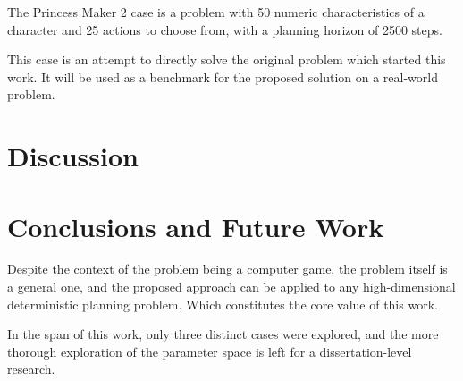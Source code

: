\documentclass[11pt, a4paper]{article}
\begin{document}
	The Princess Maker 2 case is a problem with 50 numeric characteristics of a character and 25 actions to choose from, with a planning horizon of 2500 steps.

	This case is an attempt to directly solve the original problem which started this work.
	It will be used as a benchmark for the proposed solution on a real-world problem.

	\section{Discussion}

	\section{Conclusions and Future Work}

	Despite the context of the problem being a computer game, the problem itself is a general one, and the proposed approach can be applied to any high-dimensional deterministic planning problem.
	Which constitutes the core value of this work.

	In the span of this work, only three distinct cases were explored, and the more thorough exploration of the parameter space is left for a dissertation-level research.

	\printbibliography
\end{document}
